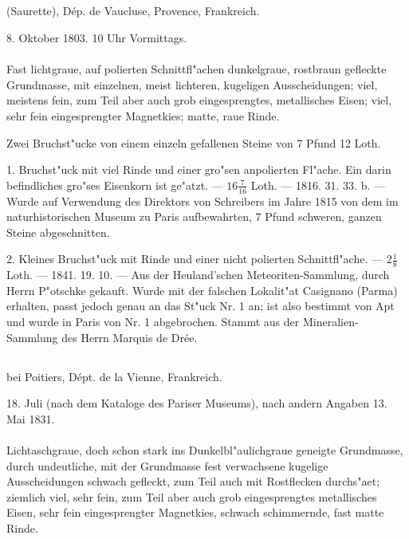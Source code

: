 \documentclass[a4paper, 11pt, oneside, polutonikogreek, german]{article}
\begin{document}
\subsection{}
\begin{center}

(Saurette), Dép. de Vaucluse, Provence, Frankreich.

8. Oktober 1803. 10 Uhr Vormittags.
\end{center}
\paragraph{}
Fast lichtgraue, auf polierten Schnittfl"achen dunkelgraue, rostbraun gefleckte Grundmasse, mit einzelnen, meist lichteren, kugeligen Ausscheidungen; viel, meistens fein, zum Teil aber auch grob eingesprengtes, metallisches Eisen; viel, sehr fein eingesprengter Magnetkies; matte, raue Rinde.

Zwei Bruchst"ucke von einem einzeln gefallenen Steine von 7 Pfund 12 Loth.

1. Bruchst"uck mit viel Rinde und einer gro"sen anpolierten Fl"ache. Ein darin befindliches gro"ses Eisenkorn ist ge"atzt. --- $16\frac{7}{16}$ Loth. --- 1816. 31. 33. b. --- Wurde auf Verwendung des Direktors von Schreibers im Jahre 1815 von dem im naturhistorischen Museum zu Paris aufbewahrten, 7 Pfund schweren, ganzen Steine abgeschnitten.

2. Kleines Bruchst"uck mit Rinde und einer nicht polierten Schnittfl"ache. --- $2\frac{1}{8}$ Loth. --- 1841. 19. 10. --- Aus der Heuland'schen Meteoriten-Sammlung, durch Herrn P"otschke gekauft. Wurde mit der falschen Lokalit"at Casignano (Parma) erhalten, passt jedoch genau an das St"uck Nr. 1 an; ist also bestimmt von Apt und wurde in Paris von Nr. 1 abgebrochen. Stammt aus der Mineralien-Sammlung des Herrn Marquis de Drée.
\subsection[\frakfamily{Vouillé.}]{}
\begin{center}

bei Poitiers, Dépt. de la Vienne, Frankreich.

18. Juli (nach dem Kataloge des Pariser Museums), nach andern Angaben 13. Mai 1831.
\end{center}
\paragraph{}
Lichtaschgraue, doch schon stark ins Dunkelbl"aulichgraue geneigte Grundmasse, durch undeutliche, mit der Grundmasse fest verwachsene kugelige Ausscheidungen schwach gefleckt, zum Teil auch mit Rostflecken durchs"aet; ziemlich viel, sehr fein, zum Teil aber auch grob eingesprengtes metallisches Eisen, sehr fein eingesprengter Magnetkies, schwach schimmernde, fast matte Rinde.
\end{document}
